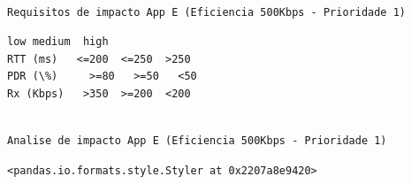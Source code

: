 \documentclass[11pt]{article}
\begin{document}
    \begin{Verbatim}[commandchars=\\\{\}]

Requisitos de impacto App E (Eficiencia 500Kbps - Prioridade 1)

    \end{Verbatim}

    
    \begin{Verbatim}[commandchars=\\\{\}]
             low medium  high
RTT (ms)   <=200  <=250  >250
PDR (\%)     >=80   >=50   <50
Rx (Kbps)   >350  >=200  <200
    \end{Verbatim}

    
    \begin{Verbatim}[commandchars=\\\{\}]

Analise de impacto App E (Eficiencia 500Kbps - Prioridade 1)

    \end{Verbatim}

    
    \begin{Verbatim}[commandchars=\\\{\}]
<pandas.io.formats.style.Styler at 0x2207a8e9420>
    \end{Verbatim}
\end{document}
